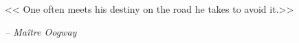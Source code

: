 \begin{comment}
\end{comment}

\chapter*{}
\vspace{-10pt}
\begin{flushright}
    << One often meets his destiny on the road he takes to avoid it.>>

    \emph{-- Maître Oogway}
\end{flushright}
